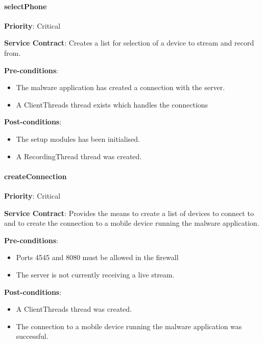 			
        \paragraph{selectPhone}
			\begin{description}
			    \item{\textbf{Priority}:} Critical%
			    \item{\textbf{Service Contract}:} Creates a list for selection of a device to stream and record from.%
			    \item{\textbf{Pre-conditions}:}%
    			    \begin{itemize}
    			        \item The malware application has created a connection with the server.
    			        \item A ClientThreads thread exists which handles the connections
    			    \end{itemize}
			    \item{\textbf{Post-conditions}:} %
    			    \begin{itemize}
    			    \item The setup modules has been initialised.
    			    \item A RecordingThread thread was created.
    			    \end{itemize}
			\end{description}
	
	
        \paragraph{createConnection}
			\begin{description}
			    \item{\textbf{Priority}:} Critical%
			    \item{\textbf{Service Contract}:} Provides the means to create a list of devices to connect to and to create the connection to a mobile device running the malware application.%
			    \item{\textbf{Pre-conditions}:}%
    			    \begin{itemize}
    			        \item Ports 4545 and 8080 must be allowed in the firewall
    			        \item The server is not currently receiving a live stream.
    			    \end{itemize}
			    \item{\textbf{Post-conditions}:} %
    			    \begin{itemize}
    			    \item A ClientThreads thread was created. 
    			    \item The connection to a mobile device running the malware application was successful.
    			    \end{itemize}
			\end{description}
	
